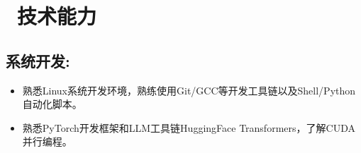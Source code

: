 \documentclass{resume}
\begin{document}



\vspace{-1mm}
\section{\faCogs\ 技术能力}
\subsection{\textbf{系统开发:}}
\begin{itemize}[nosep, leftmargin=*, topsep=0pt, partopsep=0pt]
    \item 熟悉Linux系统开发环境，熟练使用Git/GCC等开发工具链以及Shell/Python自动化脚本。
    \item 熟悉PyTorch开发框架和LLM工具链HuggingFace Transformers，了解CUDA并行编程。
\end{itemize}
\end{document}
